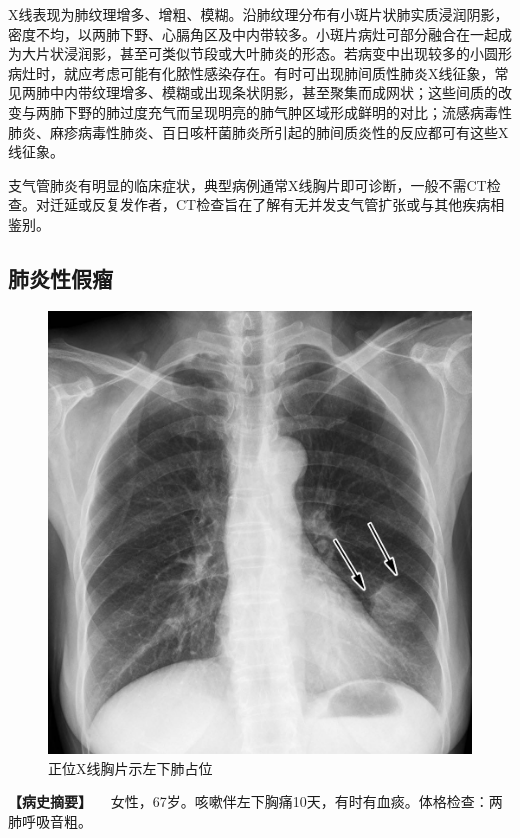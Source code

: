 X线表现为肺纹理增多、增粗、模糊。沿肺纹理分布有小斑片状肺实质浸润阴影，密度不均，以两肺下野、心膈角区及中内带较多。小斑片病灶可部分融合在一起成为大片状浸润影，甚至可类似节段或大叶肺炎的形态。若病变中出现较多的小圆形病灶时，就应考虑可能有化脓性感染存在。有时可出现肺间质性肺炎X线征象，常见两肺中内带纹理增多、模糊或出现条状阴影，甚至聚集而成网状；这些间质的改变与两肺下野的肺过度充气而呈现明亮的肺气肿区域形成鲜明的对比；流感病毒性肺炎、麻疹病毒性肺炎、百日咳杆菌肺炎所引起的肺间质炎性的反应都可有这些X线征象。

支气管肺炎有明显的临床症状，典型病例通常X线胸片即可诊断，一般不需CT检查。对迁延或反复发作者，CT检查旨在了解有无并发支气管扩张或与其他疾病相鉴别。

\subsection{肺炎性假瘤}

\begin{figure}[!htbp]
 \centering
 \includegraphics{./images/Image00151.jpg}
 \captionsetup{justification=centering}
 \caption{正位X线胸片示左下肺占位}
 \label{fig3-4-3}
  \end{figure} 

\textbf{【病史摘要】}
　女性，67岁。咳嗽伴左下胸痛10天，有时有血痰。体格检查：两肺呼吸音粗。

